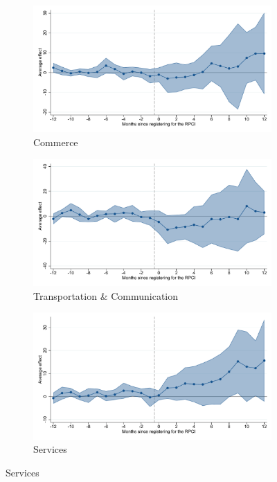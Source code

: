 \begin{figure}[H]
    \begin{subfigure}{0.32\textwidth}
    \caption{Commerce}
    \includegraphics[width=\textwidth]{04_Figures/muestra_10porciento/event_study_sal_formal_ind_commerce_dcdh_connected.pdf}
    \end{subfigure}
    \begin{subfigure}{0.32\textwidth}
    \caption{Transportation \& Communication}
    \includegraphics[width=\textwidth]{04_Figures/muestra_10porciento/event_study_sal_formal_ind_transport_dcdh_connected.pdf}
    \end{subfigure}
    \begin{subfigure}{0.32\textwidth}
    \caption{Services}
    \includegraphics[width=\textwidth]{04_Figures/muestra_10porciento/event_study_sal_formal_ind_services_dcdh_connected.pdf}
    \end{subfigure}


\end{figure}
